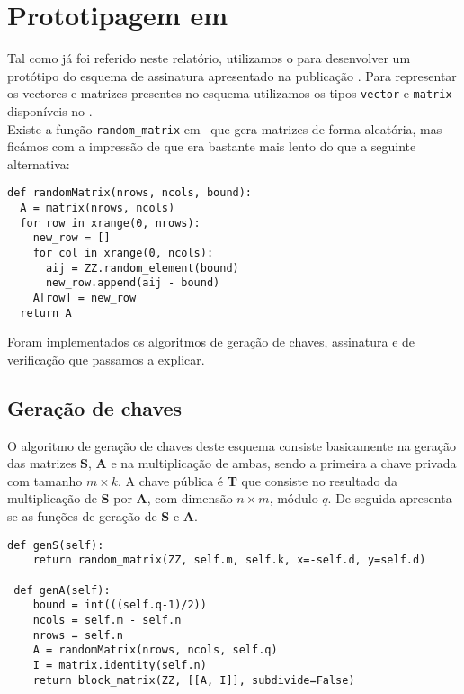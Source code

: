 \section{Prototipagem em \sage}
Tal como já foi referido neste relatório, utilizamos o \sage para desenvolver um protótipo do esquema de assinatura apresentado na publicação \cite{lattice_sig}. Para representar os vectores e matrizes presentes no esquema utilizamos os tipos \verb|vector| e \verb|matrix| disponíveis no \sage.\\
Existe a função \verb|random_matrix| em \sage\ que gera matrizes de forma aleatória, mas ficámos com a impressão de que era bastante mais lento do que a seguinte alternativa:
\begin{lstlisting}[style=sage]
def randomMatrix(nrows, ncols, bound):
  A = matrix(nrows, ncols)
  for row in xrange(0, nrows):
    new_row = []
    for col in xrange(0, ncols):
      aij = ZZ.random_element(bound)
      new_row.append(aij - bound)
    A[row] = new_row
  return A
\end{lstlisting}
Foram implementados os algoritmos de geração de chaves, assinatura e de verificação que passamos a explicar.
\subsection{Geração de chaves}
O algoritmo de geração de chaves deste esquema consiste basicamente na geração das matrizes \textbf{S}, \textbf{A} e na multiplicação de ambas, sendo a primeira a chave privada com tamanho $m \times k$. A chave pública é \textbf{T} que consiste no resultado da multiplicação de \textbf{S} por \textbf{A}, com dimensão $n \times m$, módulo $q$. De seguida apresenta-se as funções de geração de \textbf{S} e \textbf{A}.\\
\begin{lstlisting}[style=sage]
 def genS(self):
    return random_matrix(ZZ, self.m, self.k, x=-self.d, y=self.d)

 def genA(self):
    bound = int(((self.q-1)/2))
    ncols = self.m - self.n
    nrows = self.n
    A = randomMatrix(nrows, ncols, self.q)
    I = matrix.identity(self.n)
    return block_matrix(ZZ, [[A, I]], subdivide=False)
\end{lstlisting}
